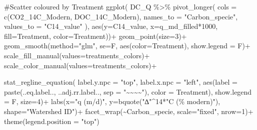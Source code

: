 \documentclass[
  letterpaper,
  DIV=11,
  numbers=noendperiod]{scrartcl}
\newenvironment{Shaded}{\begin{snugshade}}{\end{snugshade}}
\newcommand{\AttributeTok}[1]{\textcolor[rgb]{0.40,0.45,0.13}{#1}}
\newcommand{\CommentTok}[1]{\textcolor[rgb]{0.37,0.37,0.37}{#1}}
\newcommand{\DecValTok}[1]{\textcolor[rgb]{0.68,0.00,0.00}{#1}}
\newcommand{\FunctionTok}[1]{\textcolor[rgb]{0.28,0.35,0.67}{#1}}
\newcommand{\NormalTok}[1]{\textcolor[rgb]{0.00,0.23,0.31}{#1}}
\newcommand{\SpecialCharTok}[1]{\textcolor[rgb]{0.37,0.37,0.37}{#1}}
\newcommand{\StringTok}[1]{\textcolor[rgb]{0.13,0.47,0.30}{#1}}
\begin{document}
\begin{Shaded}
\begin{Highlighting}[]
\CommentTok{\#Scatter coloured by Treatment}
\FunctionTok{ggplot}\NormalTok{( DC\_Q }\SpecialCharTok{\%\textgreater{}\%} \FunctionTok{pivot\_longer}\NormalTok{(}
                     \AttributeTok{cols =} \FunctionTok{c}\NormalTok{(CO2\_14C\_Modern, DOC\_14C\_Modern),}
                     \AttributeTok{names\_to =} \StringTok{"Carbon\_specie"}\NormalTok{,}
                     \AttributeTok{values\_to =} \StringTok{"C14\_value"}
\NormalTok{                   ),}
       \FunctionTok{aes}\NormalTok{(}\AttributeTok{y=}\NormalTok{C14\_value, }\AttributeTok{x=}\NormalTok{q\_md\_filled}\SpecialCharTok{*}\DecValTok{1000}\NormalTok{, }\AttributeTok{fill=}\NormalTok{Treatment, }\AttributeTok{color=}\NormalTok{Treatment))}\SpecialCharTok{+}
  \FunctionTok{geom\_point}\NormalTok{(}\AttributeTok{size=}\DecValTok{3}\NormalTok{)}\SpecialCharTok{+}
  \FunctionTok{geom\_smooth}\NormalTok{(}\AttributeTok{method=}\StringTok{"glm"}\NormalTok{, }\AttributeTok{se=}\NormalTok{F, }\FunctionTok{aes}\NormalTok{(}\AttributeTok{color=}\NormalTok{Treatment), }\AttributeTok{show.legend =}\NormalTok{ F)}\SpecialCharTok{+}
  \FunctionTok{scale\_fill\_manual}\NormalTok{(}\AttributeTok{values=}\NormalTok{treatments\_colors)}\SpecialCharTok{+} 
  \FunctionTok{scale\_color\_manual}\NormalTok{(}\AttributeTok{values=}\NormalTok{treatments\_colors)}\SpecialCharTok{+} 
  
  \FunctionTok{stat\_regline\_equation}\NormalTok{(}
  \AttributeTok{label.y.npc =} \StringTok{"top"}\NormalTok{, }\AttributeTok{label.x.npc =} \StringTok{"left"}\NormalTok{,}
  \FunctionTok{aes}\NormalTok{(}\AttributeTok{label =}  \FunctionTok{paste}\NormalTok{(..eq.label.., ..adj.rr.label.., }
                     \AttributeTok{sep =} \StringTok{"\textasciitilde{}\textasciitilde{}\textasciitilde{}\textasciitilde{}"}\NormalTok{), }\AttributeTok{color =}\NormalTok{ Treatment), }
  \AttributeTok{show.legend =}\NormalTok{ F, }\AttributeTok{size=}\DecValTok{4}\NormalTok{)}\SpecialCharTok{+}
  \FunctionTok{labs}\NormalTok{(}\AttributeTok{x=}\StringTok{"q (m/d)"}\NormalTok{, }\AttributeTok{y=}\FunctionTok{bquote}\NormalTok{(}\StringTok{"∆"}\SpecialCharTok{\^{}}\DecValTok{14}\SpecialCharTok{*}\StringTok{"C (\% modern)"}\NormalTok{), }\AttributeTok{shape=}\StringTok{"Watershed ID"}\NormalTok{)}\SpecialCharTok{+}
  \FunctionTok{facet\_wrap}\NormalTok{(}\SpecialCharTok{\textasciitilde{}}\NormalTok{Carbon\_specie, }\AttributeTok{scale=}\StringTok{"fixed"}\NormalTok{, }\AttributeTok{nrow=}\DecValTok{1}\NormalTok{)}\SpecialCharTok{+}
  \FunctionTok{theme}\NormalTok{(}\AttributeTok{legend.position =} \StringTok{"top"}\NormalTok{)}
\end{Highlighting}
\end{Shaded}
\end{document}
